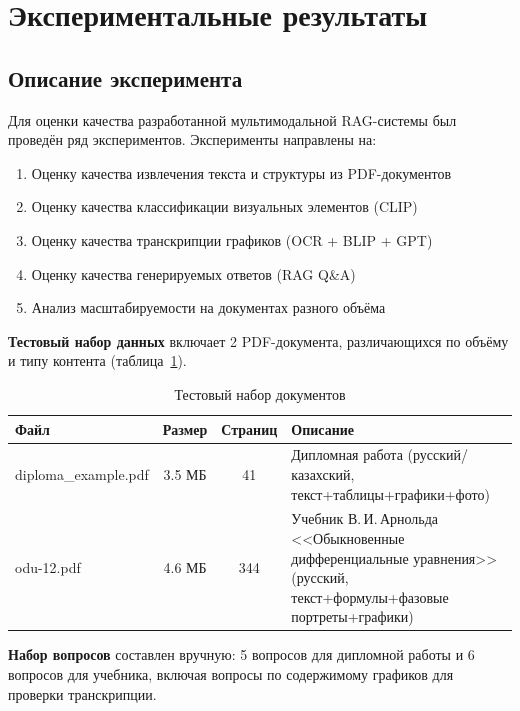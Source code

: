 \documentclass[a4paper,12pt]{article}
\begin{document}
\newpage

\section{Экспериментальные результаты}

\subsection{Описание эксперимента}

Для оценки качества разработанной мультимодальной RAG-системы был проведён ряд экспериментов. Эксперименты направлены на:
\begin{enumerate}
    \item Оценку качества извлечения текста и структуры из PDF-документов
    \item Оценку качества классификации визуальных элементов (CLIP)
    \item Оценку качества транскрипции графиков (OCR + BLIP + GPT)
    \item Оценку качества генерируемых ответов (RAG Q\&A)
    \item Анализ масштабируемости на документах разного объёма
\end{enumerate}

\textbf{Тестовый набор данных} включает 2 PDF-документа, различающихся по объёму и типу контента (таблица~\ref{tab:test-docs}).

\begin{table}[H]
    \centering
    \caption{Тестовый набор документов}
    \label{tab:test-docs}
    \begin{tabularx}{\textwidth}{|l|c|c|X|}
        \hline
        \textbf{Файл} & \textbf{Размер} & \textbf{Страниц} & \textbf{Описание} \\
        \hline
        diploma\_example.pdf & 3.5 МБ & 41 & Дипломная работа (русский/казахский, текст+таблицы+графики+фото) \\
        \hline
        odu-12.pdf & 4.6 МБ & 344 & Учебник В.\,И.\,Арнольда <<Обыкновенные дифференциальные уравнения>> (русский, текст+формулы+фазовые портреты+графики) \\
        \hline
    \end{tabularx}
\end{table}

\textbf{Набор вопросов} составлен вручную: 5 вопросов для дипломной работы и 6 вопросов для учебника, включая вопросы по содержимому графиков для проверки транскрипции.
\end{document}
